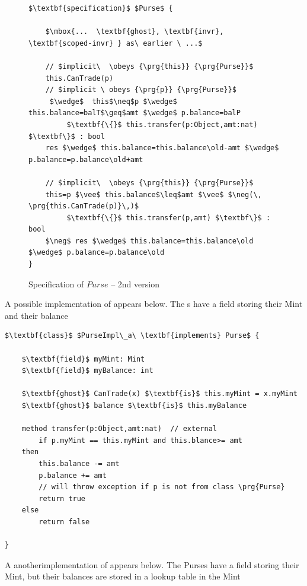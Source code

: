  
 \begin{figure}[t]
\begin{lstlisting}[mathescape=true, language=Chainmail, frame=lines]
$\textbf{specification}$ $Purse$ {
    
    $\mbox{...  \textbf{ghost}, \textbf{invr}, \textbf{scoped-invr} } as\ earlier \ ...$
     
    // $implicit\  \obeys {\prg{this}} {\prg{Purse}}$
    this.CanTrade(p) 
    // $implicit \ obeys {\prg{p}} {\prg{Purse}}$
     $\wedge$  this$\neq$p $\wedge$ this.balance=balT$\geq$amt $\wedge$ p.balance=balP
         $\textbf{\{}$ this.transfer(p:Object,amt:nat) $\textbf\}$ : bool
    res $\wedge$ this.balance=this.balance\old-amt $\wedge$ p.balance=p.balance\old+amt 

    // $implicit\  \obeys {\prg{this}} {\prg{Purse}}$
    this=p $\vee$ this.balance$\leq$amt $\vee$ $\neg(\, \prg{this.CanTrade(p)}\,)$  
         $\textbf{\{}$ this.transfer(p,amt) $\textbf\}$ : bool
    $\neg$ res $\wedge$ this.balance=this.balance\old $\wedge$ p.balance=p.balance\old
}

\end{lstlisting}
\caption{Specification of  $Purse$ -- 2nd version}
\label{fig:PurseSpec:two}
 \end{figure}
 
 
A possible implementation of  appears below. The s have a field storing their Mint and their balance

\begin{lstlisting}[mathescape=true, language=Chainmail, frame=lines]
$\textbf{class}$ $PurseImpl\_a\ \textbf{implements} Purse$ {
    
    $\textbf{field}$ myMint: Mint
    $\textbf{field}$ myBalance: int
     
    $\textbf{ghost}$ CanTrade(x) $\textbf{is}$ this.myMint = x.myMint
    $\textbf{ghost}$ balance $\textbf{is}$ this.myBalance
    
    method transfer(p:Object,amt:nat)  // external
    	if p.myMint == this.myMint and this.blance>= amt 
	then
		this.balance -= amt
		p.balance += amt
		// will throw exception if p is not from class \prg{Purse}
		return true
	else
		return false	
  
}
\end{lstlisting}

A anotherimplementation of  appears below. The Purses have a field storing their Mint, but their balances are stored in a 
lookup table in the Mint

